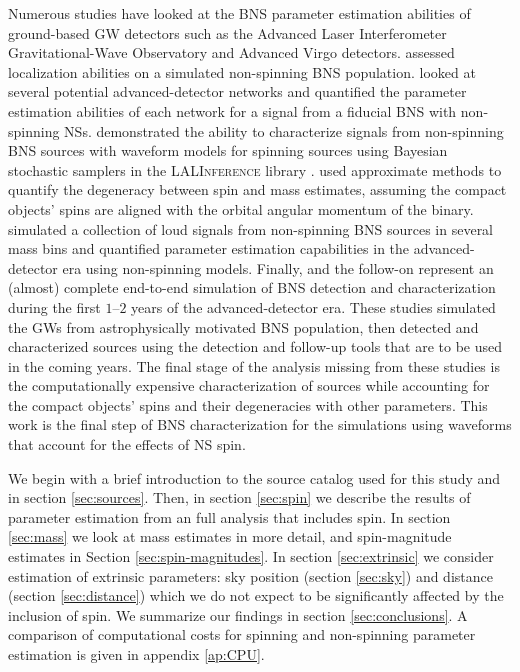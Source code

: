 Numerous studies have looked at the BNS parameter estimation abilities of ground-based GW detectors such as the Advanced Laser Interferometer Gravitational-Wave Observatory \citep[aLIGO;][]{Aasi_2015} and Advanced Virgo \citep[AdV;][]{Acernese_2014} detectors. \citet{Nissanke_2010,Nissanke_2011} assessed localization abilities on a simulated non-spinning BNS population. \citet{Veitch_2012} looked at several potential advanced-detector networks and quantified the parameter estimation abilities of each network for a signal from a fiducial BNS with non-spinning NSs. \citet{Aasi_2013} demonstrated the ability to characterize signals from non-spinning BNS sources with waveform models for spinning sources using Bayesian stochastic samplers in the \textsc{LALInference} library \citep{Veitch_2014}.  \citet{Hannam_2013} used approximate methods to quantify the degeneracy between spin and mass estimates, assuming the compact objects' spins are aligned with the orbital angular momentum of the binary. \citet{Rodriguez_2014} simulated a collection of loud signals from non-spinning BNS sources in several mass bins and quantified parameter estimation capabilities in the advanced-detector era using non-spinning models.  Finally, \citet{Singer_2014} and the follow-on \citet{Berry_2014} represent an (almost) complete end-to-end simulation of BNS detection and characterization during the first $1$--$2$ years of the advanced-detector era. These studies simulated the GWs from astrophysically motivated BNS population, then detected and characterized sources using the detection and follow-up tools that are to be used in the coming years.   The final stage of the analysis missing from these studies is the computationally expensive characterization of sources while accounting for the compact objects' spins and their degeneracies with other parameters.  This work is the final step of BNS characterization for the \citet{Singer_2014} simulations using waveforms that account for the effects of NS spin.

We begin with a brief introduction to the source catalog used for this study and \citet{Singer_2014} in section \ref{sec:sources}. Then, in section \ref{sec:spin} we describe the results of parameter estimation from an full analysis that includes spin. In section \ref{sec:mass} we look at mass estimates in more detail, and spin-magnitude estimates in Section \ref{sec:spin-magnitudes}. In section \ref{sec:extrinsic} we consider estimation of extrinsic parameters: sky position (section \ref{sec:sky}) and distance (section \ref{sec:distance}) which we do not expect to be significantly affected by the inclusion of spin. We summarize our findings in section \ref{sec:conclusions}. A comparison of computational costs for spinning and non-spinning parameter estimation is given in appendix \ref{ap:CPU}.
    
  
  
  
  
  